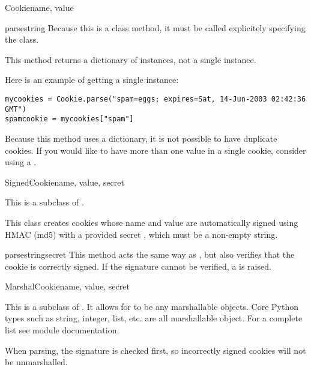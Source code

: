 \begin{classdesc}{Cookie}{name, value}
\begin{methoddesc}[Cookie]{parse}{string}
    Because this is a class method, it must be called explicitely
    specifying the class.

    This method returns a dictionary of  instances, not
    a single  instance.

    Here is an example of getting a single  instance:
    \begin{verbatim}
mycookies = Cookie.parse("spam=eggs; expires=Sat, 14-Jun-2003 02:42:36 GMT")
spamcookie = mycookies["spam"]
    \end{verbatim}

    \begin{notice}
      Because this method uses a dictionary, it is not possible to
      have duplicate cookies. If you would like to have more than one
      value in a single cookie, consider using a .
    \end{notice}

  \end{methoddesc}

\end{classdesc}

\begin{classdesc}{SignedCookie}{name, value, secret}

  This is a subclass of .

  This class creates cookies whose name and value are automatically
  signed using HMAC (md5) with a provided secret , which must be
  a non-empty string.

  \begin{methoddesc}[Cookie]{parse}{string}{secret}
    This method acts the same way as , but also
    verifies that the cookie is correctly signed. If the signature
    cannot be verified, a  is raised.
  \end{methoddesc}

\end{classdesc}

\begin{classdesc}{MarshalCookie}{name, value, secret}

  This is a subclass of . It allows for
   to be any marshallable objects. Core Python types such as
  string, integer, list, etc. are all marshallable object. For a
  complete list see
  module documentation.

  When parsing, the signature is checked first, so incorrectly signed cookies
  will not be unmarshalled.

\end{classdesc}

